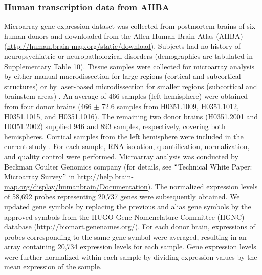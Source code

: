 \begin{refsection}
\subsubsection*{Human transcription data from AHBA}
Microarray gene expression dataset was collected from postmortem brains of six human donors and downloaded from the Allen Human Brain Atlas (AHBA) (\url{http://human.brain-map.org/static/download}). Subjects had no history of neuropsychiatric or neuropathological disorders (demographics are tabulated in Supplementary Table 10). Tissue samples were collected for microarray analysis by either manual macrodissection for large regions (cortical and subcortical structures) or by laser-based microdissection for smaller regions (subcortical and brainstem areas) \citep{Hawrylycz2012AnAC}. An average of 466 samples (left hemisphere) were obtained from four donor brains (466 $ \pm $  72.6 samples from H0351.1009, H0351.1012, H0351.1015, and H0351.1016). The remaining two donor brains (H0351.2001 and H0351.2002) supplied 946 and 893 samples, respectively, covering both hemispheres. Cortical samples from the left hemisphere were included in the current study \citep{Romme2017ConnectomeDA}. For each sample, RNA isolation, quantification, normalization, and quality control were performed. Microarray analysis was conducted by Beckman Coulter Genomics company (for details, see $``$Technical White Paper: Microarray Survey$"$  in \url{http://help.brain-map.org/display/humanbrain/Documentation}). The normalized expression levels of 58,692 probes representing 20,737 genes were subsequently obtained. We updated gene symbols by replacing the previous and alias gene symbols by the approved symbols from the HUGO Gene Nomenclature Committee (HGNC) database (http://biomart.genenames.org/). For each donor brain, expressions of probes corresponding to the same gene symbol were averaged, resulting in an array containing 20,734 expression levels for each sample. Gene expression levels were further normalized within each sample by dividing expression values by the mean expression of the sample.


\end{refsection}

